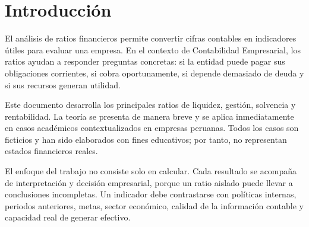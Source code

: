 \section{Introducción}
El análisis de ratios financieros permite convertir cifras contables en indicadores útiles para evaluar una empresa. En el contexto de Contabilidad Empresarial, los ratios ayudan a responder preguntas concretas: si la entidad puede pagar sus obligaciones corrientes, si cobra oportunamente, si depende demasiado de deuda y si sus recursos generan utilidad.

Este documento desarrolla los principales ratios de liquidez, gestión, solvencia y rentabilidad. La teoría se presenta de manera breve y se aplica inmediatamente en casos académicos contextualizados en empresas peruanas. Todos los casos son ficticios y han sido elaborados con fines educativos; por tanto, no representan estados financieros reales.

El enfoque del trabajo no consiste solo en calcular. Cada resultado se acompaña de interpretación y decisión empresarial, porque un ratio aislado puede llevar a conclusiones incompletas. Un indicador debe contrastarse con políticas internas, periodos anteriores, metas, sector económico, calidad de la información contable y capacidad real de generar efectivo.
